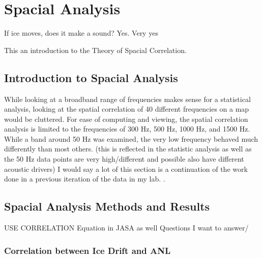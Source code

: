
\chapter{Spacial Analysis}

\begin{center}
  \begin{minipage}{0.5\textwidth}
    \begin{small}
       If ice moves, does it make a sound? Yes. Very yes
    \end{small}
  \end{minipage}
  \vspace{0.5cm}
\end{center}

\noindent This an introduction to the Theory of Spacial Correlation.

\section{Introduction to Spacial Analysis}
While looking at a broadband range of frequencies makes sense for a statistical analysis, looking at the spatial correlation of 40 different frequencies on a map would be cluttered. For ease of computing and viewing, the spatial correlation analysis is limited to the frequencies of 300 Hz, 500 Hz, 1000 Hz, and 1500 Hz. While a band around 50 Hz was examined, the very low frequency behaved much differently than most others. (this is reflected in the statistic analysis as well as the 50 Hz data points are very high/different and possible also have different acoustic drivers) I would say a lot of this section is a continuation of the work done in a previous iteration of the data in my lab. \autocite{BonnelMain}.

\section{Spacial Analysis Methods and Results}


USE CORRELATION Equation in JASA as well
Questions I want to answer/

\subsection{Correlation between Ice Drift and ANL}

